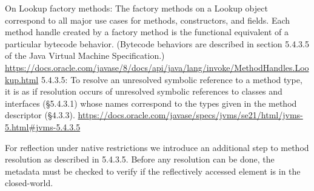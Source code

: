 On Lookup factory methods:
The factory methods on a Lookup object correspond to all major use cases for methods, constructors, and fields. Each method handle created by a factory method is the functional equivalent of a particular bytecode behavior. (Bytecode behaviors are described in section 5.4.3.5 of the Java Virtual Machine Specification.)
\url{https://docs.oracle.com/javase/8/docs/api/java/lang/invoke/MethodHandles.Lookup.html}
5.4.3.5:
To resolve an unresolved symbolic reference to a method type, it is as if resolution occurs of unresolved symbolic references to classes and interfaces (§5.4.3.1) whose names correspond to the types given in the method descriptor (§4.3.3).
\url{https://docs.oracle.com/javase/specs/jvms/se21/html/jvms-5.html#jvms-5.4.3.5}

For reflection under native restrictions we introduce an additional step to method resolution as described in 5.4.3.5. Before any resolution can be done, the metadata must be checked to verify if the reflectively accessed element is in the closed-world.






